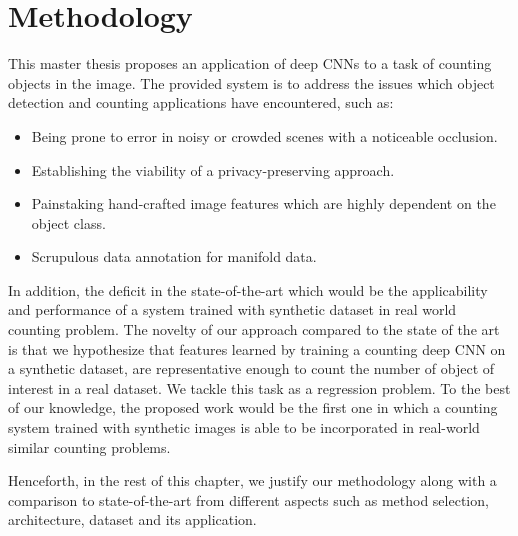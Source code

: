 \newpage
\chapter{Methodology}
\label{sec:proposal}
\noindent
This master thesis proposes an application of deep CNNs to a task of counting objects in the image. The provided system is to address the issues which object detection and counting applications have encountered, such as:
\begin{itemize}
	\item Being prone to error in noisy or crowded scenes with a noticeable occlusion. 
	\item Establishing the viability of a privacy-preserving approach. 
	\item {}Painstaking hand-crafted image features which are highly dependent on the object class. 
	\item {}Scrupulous data annotation for manifold data. 
\end{itemize} 
In addition, the deficit in the state-of-the-art \cite{segui2015learning} which would be the applicability and performance of a system trained with synthetic dataset in real world counting problem\cite{chan2008privacy}. The novelty of our approach compared to the state of the art is that we hypothesize that features learned by training a counting deep CNN on a synthetic dataset, are representative enough to count the number of object of interest in a real dataset. We tackle this task as a regression problem. 
To the best of our knowledge, the proposed work would be the first one in which a counting system trained with synthetic images is able to be incorporated in real-world similar counting problems.

Henceforth, in the rest of this chapter, we justify our methodology along with a comparison to state-of-the-art from different aspects such as method selection, architecture, dataset and its application.   



